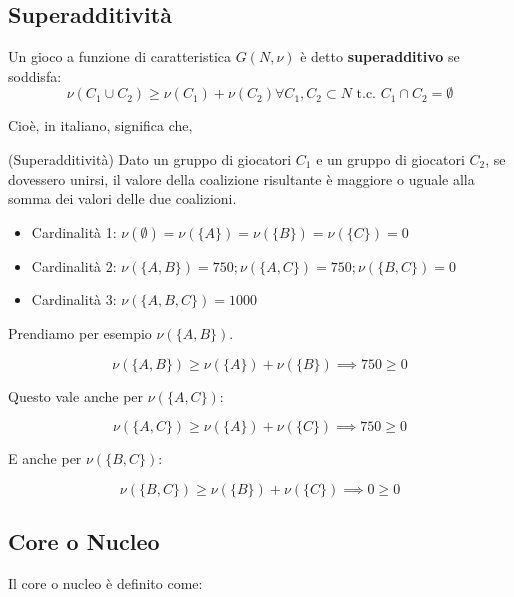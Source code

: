 \subsection{Superadditività}

Un gioco a funzione di caratteristica $G(N,\nu)$ è detto \textbf{superadditivo}
se soddisfa:
\[
    \nu(C_1 \cup C_2) \geq \nu(C_1) + \nu(C_2) \forall C_1,C_2 \subset N \text{ t.c. } C_1 \cap C_2 = \emptyset
\]

Cioè, in italiano, significa che,

\begin{definition}(Superadditività)
    Dato un gruppo di giocatori $C_1$ e un gruppo di giocatori $C_2$, se dovessero unirsi, il
    valore della coalizione risultante è maggiore o uguale alla somma dei valori
    delle due coalizioni.
\end{definition}

\begin{itemize}
    \item Cardinalità 1: $\nu(\emptyset) = \nu(\{A\}) = \nu(\{B\}) = \nu(\{C\}) = 0$
    \item Cardinalità 2: $\nu(\{A,B\}) = 750; \nu(\{A,C\}) = 750; \nu(\{B,C\}) = 0$
    \item Cardinalità 3: $\nu(\{A,B,C\}) = 1000$
\end{itemize}

Prendiamo per esempio $\nu(\{A,B\})$.

\begin{equation}
    \nu(\{A,B\}) \geq \nu(\{A\}) + \nu(\{B\}) \implies 750 \geq 0
\end{equation}

Questo vale anche per $\nu(\{A,C\})$:

\begin{equation}
    \nu(\{A,C\}) \geq \nu(\{A\}) + \nu(\{C\}) \implies 750 \geq 0
\end{equation}

E anche per $\nu(\{B,C\})$:

\begin{equation}
    \nu(\{B,C\}) \geq \nu(\{B\}) + \nu(\{C\}) \implies 0 \geq 0
\end{equation}

\subsection{Core o Nucleo}

Il core o nucleo è definito come:

